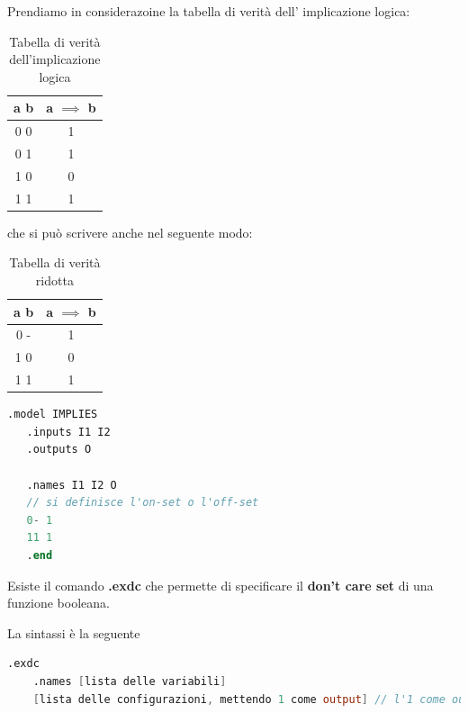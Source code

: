 \documentclass[a4paper]{article}
\theoremstyle{break}
\theoremstyle{break}
\theoremstyle{break}
\theoremstyle{break}
\begin{document}
\begin{example}
   Prendiamo in considerazoine la tabella di verità dell'
   implicazione logica:
   \begin{table}[H]
    \begin{center}
        \begin{tabular}{c|c}
            a b & a \(\implies\) b\\
            \hline
            0 0 & 1\\
            0 1 & 1\\
            1 0 & 0\\
            1 1 & 1\\
        \end{tabular}
    \end{center}
    \caption{Tabella di verità dell'implicazione logica}
   \end{table}
   che si può scrivere anche nel seguente modo:
      \begin{table}[H]
    \begin{center}
        \begin{tabular}{c|c}
            a b & a \(\implies\) b\\
            \hline
            0 - & 1\\
            1 0 & 0\\
            1 1 & 1\\
        \end{tabular}
    \end{center}
    \caption{Tabella di verità ridotta}
   \end{table}

\begin{lstlisting}[language=Verilog]
   .model IMPLIES
   .inputs I1 I2
   .outputs O

   .names I1 I2 O
   // si definisce l'on-set o l'off-set  
   0- 1
   11 1
   .end
\end{lstlisting}
\end{example}

Esiste il comando \textbf{.exdc} che permette di specificare il \textbf{don't care set} di una funzione booleana.

La sintassi è la seguente
\begin{lstlisting}[language=Verilog]
    .exdc
    .names [lista delle variabili]
    [lista delle configurazioni, mettendo 1 come output] // l'1 come output non vuol dire che si sta forzando il don't care a 1, ma serve solo per il parser
\end{lstlisting}
\end{document}
